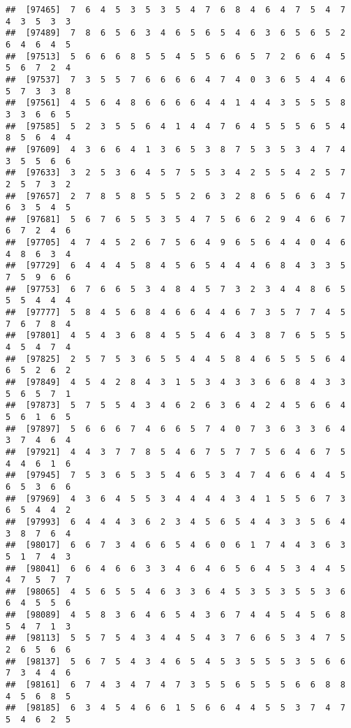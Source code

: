 \documentclass[
]{book}
\begin{document}
\begin{verbatim}
##  [97465]  7  6  4  5  3  5  3  5  4  7  6  8  4  6  4  7  5  4  7  4  3  5  3  3
##  [97489]  7  8  6  5  6  3  4  6  5  6  5  4  6  3  6  5  6  5  2  6  4  6  4  5
##  [97513]  5  6  6  6  8  5  5  4  5  5  6  6  5  7  2  6  6  4  5  5  6  7  2  4
##  [97537]  7  3  5  5  7  6  6  6  6  4  7  4  0  3  6  5  4  4  6  5  7  3  3  8
##  [97561]  4  5  6  4  8  6  6  6  6  4  4  1  4  4  3  5  5  5  8  3  3  6  6  5
##  [97585]  5  2  3  5  5  6  4  1  4  4  7  6  4  5  5  5  6  5  4  8  5  6  4  4
##  [97609]  4  3  6  6  4  1  3  6  5  3  8  7  5  3  5  3  4  7  4  3  5  5  6  6
##  [97633]  3  2  5  3  6  4  5  7  5  5  3  4  2  5  5  4  2  5  7  2  5  7  3  2
##  [97657]  2  7  8  5  8  5  5  5  2  6  3  2  8  6  5  6  6  4  7  6  3  5  4  5
##  [97681]  5  6  7  6  5  5  3  5  4  7  5  6  6  2  9  4  6  6  7  6  7  2  4  6
##  [97705]  4  7  4  5  2  6  7  5  6  4  9  6  5  6  4  4  0  4  6  4  8  6  3  4
##  [97729]  6  4  4  4  5  8  4  5  6  5  4  4  4  6  8  4  3  3  5  7  5  9  6  6
##  [97753]  6  7  6  6  5  3  4  8  4  5  7  3  2  3  4  4  8  6  5  5  5  4  4  4
##  [97777]  5  8  4  5  6  8  4  6  6  4  4  6  7  3  5  7  7  4  5  7  6  7  8  4
##  [97801]  4  5  4  3  6  8  4  5  5  4  6  4  3  8  7  6  5  5  5  4  5  4  7  4
##  [97825]  2  5  7  5  3  6  5  5  4  4  5  8  4  6  5  5  5  6  4  6  5  2  6  2
##  [97849]  4  5  4  2  8  4  3  1  5  3  4  3  3  6  6  8  4  3  3  5  6  5  7  1
##  [97873]  5  7  5  5  4  3  4  6  2  6  3  6  4  2  4  5  6  6  4  5  6  1  6  5
##  [97897]  5  6  6  6  7  4  6  6  5  7  4  0  7  3  6  3  3  6  4  3  7  4  6  4
##  [97921]  4  4  3  7  7  8  5  4  6  7  5  7  7  5  6  4  6  7  5  4  4  6  1  6
##  [97945]  7  5  3  6  5  3  5  4  6  5  3  4  7  4  6  6  4  4  5  6  5  3  6  6
##  [97969]  4  3  6  4  5  5  3  4  4  4  4  3  4  1  5  5  6  7  3  6  5  4  4  2
##  [97993]  6  4  4  4  3  6  2  3  4  5  6  5  4  4  3  3  5  6  4  3  8  7  6  4
##  [98017]  6  6  7  3  4  6  6  5  4  6  0  6  1  7  4  4  3  6  3  5  1  7  4  3
##  [98041]  6  6  4  6  6  3  3  4  6  4  6  5  6  4  5  3  4  4  5  4  7  5  7  7
##  [98065]  4  5  6  5  5  4  6  3  3  6  4  5  3  5  3  5  5  3  6  6  4  5  5  6
##  [98089]  4  5  8  3  6  4  6  5  4  3  6  7  4  4  5  4  5  6  8  5  4  7  1  3
##  [98113]  5  5  7  5  4  3  4  4  5  4  3  7  6  6  5  3  4  7  5  2  6  5  6  6
##  [98137]  5  6  7  5  4  3  4  6  5  4  5  3  5  5  5  3  5  6  6  7  3  4  4  6
##  [98161]  6  7  4  3  4  7  4  7  3  5  5  6  5  5  5  6  6  8  8  4  5  6  8  5
##  [98185]  6  3  4  5  4  6  6  1  5  6  6  4  4  5  5  3  7  4  7  5  4  6  2  5

\end{verbatim}
\end{document}
